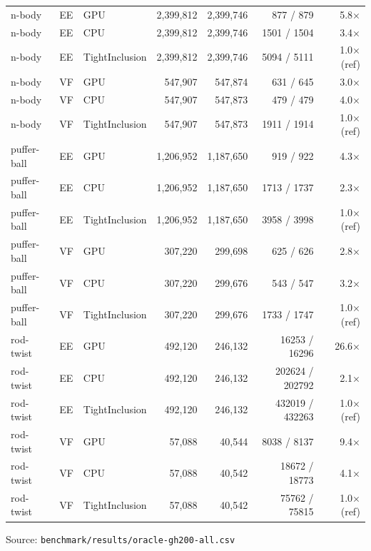 \begin{table}[htbp]
{\begin{tabular}{lllrrrr}
    n-body & EE & GPU & 2,399,812 & 2,399,746 & 877 / 879 & 5.8× \\
    n-body & EE & CPU & 2,399,812 & 2,399,746 & 1501 / 1504 & 3.4× \\
    n-body & EE & TightInclusion & 2,399,812 & 2,399,746 & 5094 / 5111 & 1.0× (ref) \\
    n-body & VF & GPU & 547,907 & 547,874 & 631 / 645 & 3.0× \\
    n-body & VF & CPU & 547,907 & 547,873 & 479 / 479 & 4.0× \\
    n-body & VF & TightInclusion & 547,907 & 547,873 & 1911 / 1914 & 1.0× (ref) \\
    puffer-ball & EE & GPU & 1,206,952 & 1,187,650 & 919 / 922 & 4.3× \\
    puffer-ball & EE & CPU & 1,206,952 & 1,187,650 & 1713 / 1737 & 2.3× \\
    puffer-ball & EE & TightInclusion & 1,206,952 & 1,187,650 & 3958 / 3998 & 1.0× (ref) \\
    puffer-ball & VF & GPU & 307,220 & 299,698 & 625 / 626 & 2.8× \\
    puffer-ball & VF & CPU & 307,220 & 299,676 & 543 / 547 & 3.2× \\
    puffer-ball & VF & TightInclusion & 307,220 & 299,676 & 1733 / 1747 & 1.0× (ref) \\
    rod-twist & EE & GPU & 492,120 & 246,132 & 16253 / 16296 & 26.6× \\
    rod-twist & EE & CPU & 492,120 & 246,132 & 202624 / 202792 & 2.1× \\
    rod-twist & EE & TightInclusion & 492,120 & 246,132 & 432019 / 432263 & 1.0× (ref) \\
    rod-twist & VF & GPU & 57,088 & 40,544 & 8038 / 8137 & 9.4× \\
    rod-twist & VF & CPU & 57,088 & 40,542 & 18672 / 18773 & 4.1× \\
    rod-twist & VF & TightInclusion & 57,088 & 40,542 & 75762 / 75815 & 1.0× (ref) \\
    \bottomrule
  \end{tabular}}
  \par\smallskip\footnotesize Source: \texttt{benchmark/results/oracle-gh200-all.csv}
\end{table}
